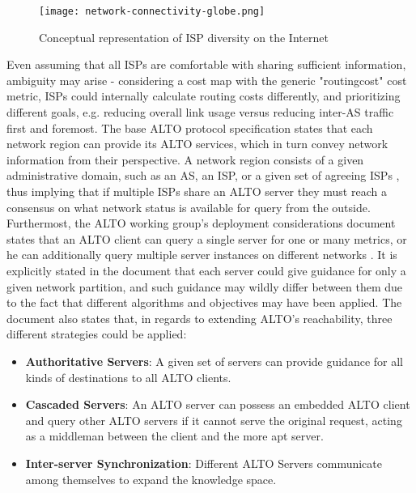     \begin{figure}[ht]
    \centering
    \texttt{[image: network-connectivity-globe.png]}
    \caption{Conceptual representation of ISP diversity on the Internet}
    \label{fig:network-connectivity-globe}
    \end{figure}

    Even assuming that all ISPs are comfortable with sharing sufficient information, ambiguity may arise - considering a cost map with the generic "routingcost" cost metric, ISPs could internally calculate routing costs differently, and prioritizing different goals, e.g. reducing overall link usage versus reducing inter-AS traffic first and foremost.
    The base ALTO protocol specification states that each network region can provide its ALTO services, which in turn convey network information from their perspective.
    A network region consists of a given administrative domain, such as an AS, an ISP, or a given set of agreeing ISPs \cite{alto-protocol}, thus implying that if multiple ISPs share an ALTO server they must reach a consensus on what network status is available for query from the outside.
    Furthermost, the ALTO working group's deployment considerations \cite{alto-deployment-considerations} document states that an ALTO client can query a single server for one or many metrics, or he can additionally query multiple server instances on different networks \cite{alto-deployment-considerations}.
    It is explicitly stated in the document that each server could give guidance for only a given network partition, and such guidance may wildly differ between them due to the fact that different algorithms and objectives may have been applied.
    The document also states that, in regards to extending ALTO's reachability, three different strategies could be applied:

\begin{itemize}
    \item \textbf{Authoritative Servers}: A given set of servers can provide guidance for all kinds of destinations to all ALTO clients.
    \item \textbf{Cascaded Servers}: An ALTO server can possess an embedded ALTO client and query other ALTO servers if it cannot serve the original request, acting as a middleman between the client and the more apt server.
    \item \textbf{Inter-server Synchronization}: Different ALTO Servers communicate among themselves to expand the knowledge space.
\end{itemize}

